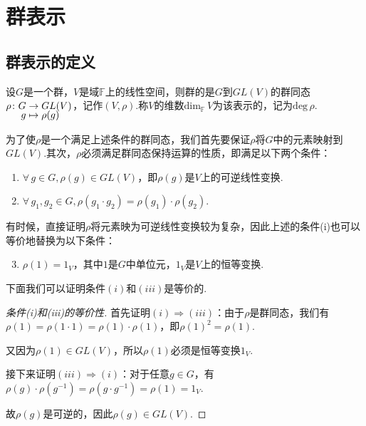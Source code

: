 \chapter{群表示}

\vspace{-1 em}
\section{群表示的定义}

\begin{definition}[群表示]
    设$G$是一个群，$V$是域$\mathbb{F}$上的线性空间，则群的是$G$到$GL(V)$的群同态$\setjot[-3]\begin{aligned}[t]
    \rho\colon G &\to GL(V) \\
    g &\mapsto \rho(g)
    \end{aligned}$，记作$(V,\rho).$称$V$的维数$\mathrm{dim}_{\mathbb{F}}\,V$为该表示的，记为$\mathrm{deg}\,\rho$.
\end{definition}

为了使$\rho$是一个满足上述条件的群同态，我们首先要保证$\rho$将$G$中的元素映射到$GL(V)$.其次，$\rho$必须满足群同态保持运算的性质，即满足以下两个条件：
\begin{enumerate}[label=(\roman*)]
    \item $\forall\, g\in G,\rho(g)\in GL(V)$，即$\rho(g)$是$V$上的可逆线性变换.
    \item $\forall\, g_1,g_2\in G,\rho(g_1\cdot g_2)=\rho(g_1)\cdot\rho(g_2)$.
\end{enumerate}

有时候，直接证明$\rho$将元素映为可逆线性变换较为复杂，因此上述的条件(i)也可以等价地替换为以下条件：
\begin{enumerate}[label=(\roman*)]
    \setcounter{enumi}{2}
    \item $\rho(1)=1_V$，其中$1$是$G$中单位元，$1_V$是$V$上的恒等变换.
\end{enumerate}

下面我们可以证明条件$(i)$和$(iii)$是等价的.
\begin{proof}[条件(i)和(iii)的等价性]\par
    首先证明$(i)\Rightarrow(iii)$：由于$\rho$是群同态，我们有$\rho(1)=\rho(1\cdot 1)=\rho(1)\cdot\rho(1)$，即$\rho(1)^2=\rho(1)$.\par
    又因为$\rho(1)\in GL(V)$，所以$\rho(1)$必须是恒等变换$1_V$.\par
    接下来证明$(iii)\Rightarrow(i)$：对于任意$g\in G$，有$\rho(g)\cdot\rho(g^{-1})=\rho(g\cdot g^{-1})=\rho(1)=1_V$.\par
    故$\rho(g)$是可逆的，因此$\rho(g)\in GL(V)$.
\end{proof}

